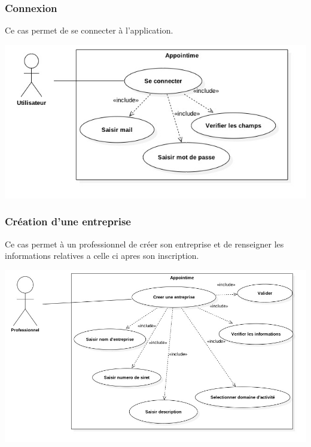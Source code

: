 \documentclass{article}
\begin{document}
\subsubsection{Connexion}
Ce cas permet de se connecter à l'application.
\begin{center}
  \includegraphics[width=400pt]{diagram/useCaseConnexion}
\end{center}

\subsubsection{Création d'une entreprise}
Ce cas permet à un professionnel de créer son entreprise et de renseigner les informations relatives a celle ci apres son inscription.
\begin{center}
  \includegraphics[width=400pt]{diagram/useCaseCreerEntreprise}
\end{center}
\end{document}
